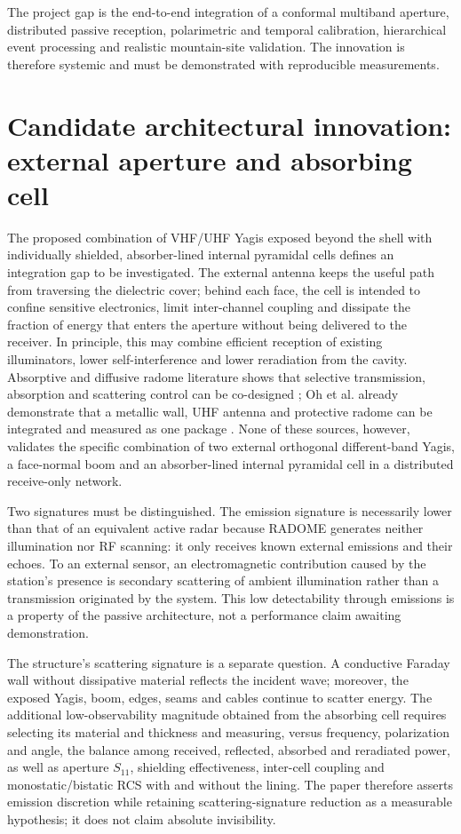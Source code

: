 The project gap is the end-to-end integration of a conformal multiband aperture, distributed passive reception, polarimetric and temporal calibration, hierarchical event processing and realistic mountain-site validation. The innovation is therefore systemic and must be demonstrated with reproducible measurements.

\section{Candidate architectural innovation: external aperture and absorbing cell}
The proposed combination of VHF/UHF Yagis exposed beyond the shell with individually shielded, absorber-lined internal pyramidal cells defines an integration gap to be investigated. The external antenna keeps the useful path from traversing the dielectric cover; behind each face, the cell is intended to confine sensitive electronics, limit inter-channel coupling and dissipate the fraction of energy that enters the aperture without being delivered to the receiver. In principle, this may combine efficient reception of existing illuminators, lower self-interference and lower reradiation from the cavity. Absorptive and diffusive radome literature shows that selective transmission, absorption and scattering control can be co-designed \cite{costa2012,lv2021}; Oh et al. already demonstrate that a metallic wall, UHF antenna and protective radome can be integrated and measured as one package \cite{oh2026}. None of these sources, however, validates the specific combination of two external orthogonal different-band Yagis, a face-normal boom and an absorber-lined internal pyramidal cell in a distributed receive-only network.

Two signatures must be distinguished. The emission signature is necessarily lower than that of an equivalent active radar because RADOME generates neither illumination nor RF scanning: it only receives known external emissions and their echoes. To an external sensor, an electromagnetic contribution caused by the station's presence is secondary scattering of ambient illumination rather than a transmission originated by the system. This low detectability through emissions is a property of the passive architecture, not a performance claim awaiting demonstration.

The structure's scattering signature is a separate question. A conductive Faraday wall without dissipative material reflects the incident wave; moreover, the exposed Yagis, boom, edges, seams and cables continue to scatter energy. The additional low-observability magnitude obtained from the absorbing cell requires selecting its material and thickness and measuring, versus frequency, polarization and angle, the balance among received, reflected, absorbed and reradiated power, as well as aperture $S_{11}$, shielding effectiveness, inter-cell coupling and monostatic/bistatic RCS with and without the lining. The paper therefore asserts emission discretion while retaining scattering-signature reduction as a measurable hypothesis; it does not claim absolute invisibility.

